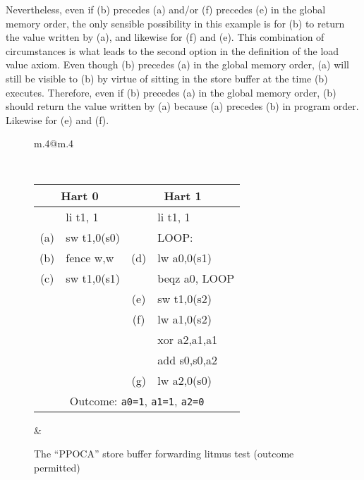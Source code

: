Nevertheless, even if (b) precedes (a) and/or (f) precedes (e) in the global memory order, the only sensible possibility in this example is for (b) to return the value written by (a), and likewise for (f) and (e).  This combination of circumstances is what leads to the second option in the definition of the load value axiom.
Even though (b) precedes (a) in the global memory order, (a) will still be visible to (b) by virtue of sitting in the store buffer at the time (b) executes.
Therefore, even if (b) precedes (a) in the global memory order, (b) should return the value written by (a) because (a) precedes (b) in program order.
Likewise for (e) and (f).

\begin{figure}[h!]
  \centering
  \begin{tabular}{m{.4\linewidth}@{\qquad}m{.4\linewidth}}
  {
    \tt\small
    \begin{tabular}{cl||cl}
    \multicolumn{2}{c}{Hart 0} & \multicolumn{2}{c}{Hart 1} \\
    \hline
          & li t1, 1    &     & li t1, 1      \\
      (a) & sw t1,0(s0) &     & LOOP:         \\
      (b) & fence w,w   & (d) & lw a0,0(s1)   \\
      (c) & sw t1,0(s1) &     & beqz a0, LOOP \\
          &             & (e) & sw t1,0(s2)   \\
          &             & (f) & lw a1,0(s2)   \\
          &             &     & xor a2,a1,a1  \\
          &             &     & add s0,s0,a2  \\
          &             & (g) & lw a2,0(s0)   \\
      \hline
      \multicolumn{4}{c}{Outcome: {\tt a0=1}, {\tt a1=1}, {\tt a2=0}}
    \end{tabular}
  }
  &
  
  \end{tabular}
  \caption{The ``PPOCA'' store buffer forwarding litmus test (outcome permitted)}
  \label{fig:litmus:ppoca}
\end{figure}

